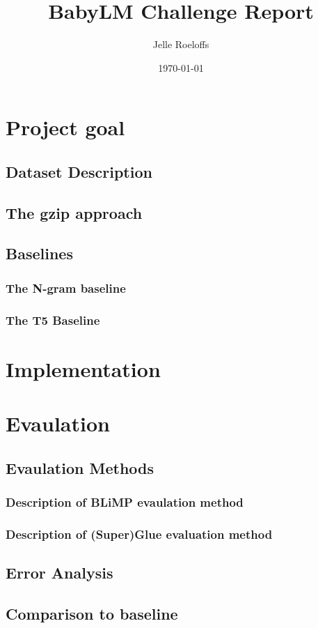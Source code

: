 \documentclass[11pt]{article}
\title{ BabyLM Challenge Report }
\author{ Jelle Roeloffs }
\date{\today}
\begin{document}
\maketitle
\pagebreak

\section{Project goal}

\subsection{Dataset Description}

\subsection{The gzip approach}

\subsection{Baselines}

\subsubsection{The N-gram baseline}

\subsubsection{The T5 Baseline}

\section{Implementation}

\section{Evaulation}

\subsection{Evaulation Methods}

\subsubsection{Description of BLiMP evaulation method}

\subsubsection{Description of (Super)Glue evaluation method}

\subsection{Error Analysis}

\subsection{Comparison to baseline}
\end{document}
